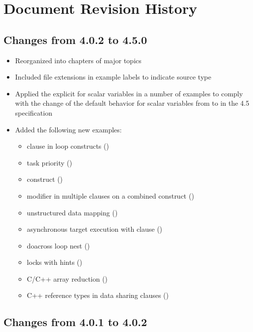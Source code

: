 \chapter{Document Revision History}
\label{chap:history}

\section{Changes from 4.0.2 to 4.5.0}
\begin{itemize}
\item Reorganized into chapters of major topics
\item Included file extensions in example labels to indicate source type
\item Applied the explicit  for scalar variables 
in a number of examples to comply with 
the change of the default behavior for scalar variables from 
 to  in the 4.5 specification
\item Added the following new examples:
\begin{itemize}
\item {} clause in loop constructs ()
\item task priority ()
\item {} construct ()
\item {} modifier in multiple  clauses on
a combined construct ()
\item unstructured data mapping ()
\item asynchronous target execution with  clause ()
\item doacross loop nest ()
\item locks with hints ()
\item C/C++ array reduction ()
\item C++ reference types in data sharing clauses ()
\end{itemize}
\end{itemize}

\section{Changes from 4.0.1 to 4.0.2}

